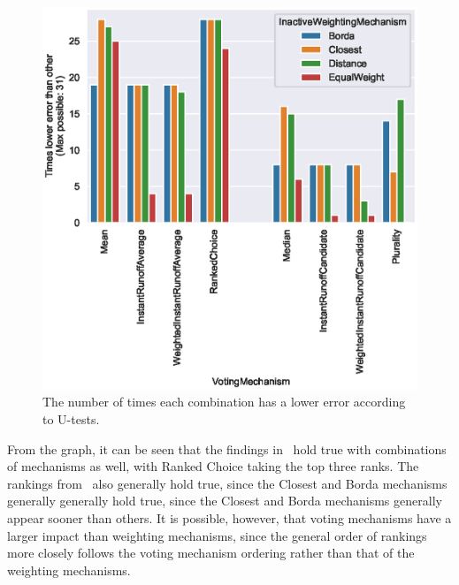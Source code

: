 \begin{figure}[htbp]
    \centering
    \includegraphics[scale=0.75]
    {./content/figures/combinations/combined_lesser_counts}
    \caption{The number of times each combination has a lower error according to
    U-tests.}
    \label{fig:combined-lesser_counts}
\end{figure}

From the graph, it can be seen that the findings
in~ hold true with combinations of
mechanisms as well, with Ranked Choice taking the top three ranks.
The rankings from~ also
generally hold true, since the Closest and Borda mechanisms generally
generally hold true, since the Closest and Borda mechanisms generally
appear sooner than others.
It is possible, however, that voting mechanisms have a larger impact than weighting
mechanisms, since the general order of rankings more closely follows the voting
mechanism ordering rather than that of the weighting mechanisms.

